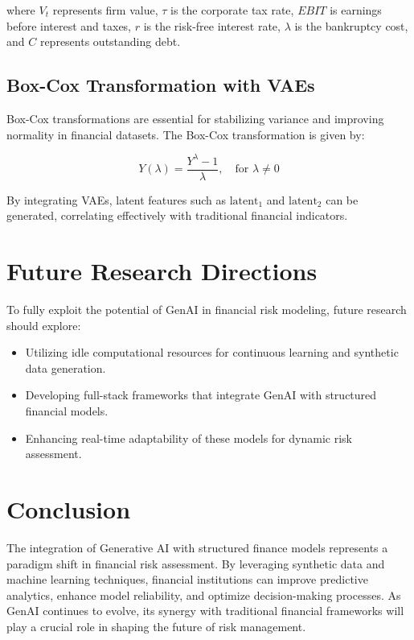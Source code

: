 \documentclass[a4paper,headinclude=on,footinclude=on,12pt,oneside]{scrbook}
\begin{document}
where $V_t$ represents firm value, $\tau$ is the corporate tax rate, $EBIT$ is earnings before interest and taxes, $r$ is the risk-free interest rate, $\lambda$ is the bankruptcy cost, and $C$ represents outstanding debt.

\subsection{Box-Cox Transformation with VAEs}
Box-Cox transformations are essential for stabilizing variance and improving normality in financial datasets. The Box-Cox transformation is given by:

\begin{equation}
	Y(\lambda) = \frac{Y^{\lambda} - 1}{\lambda}, \quad \text{for } \lambda \neq 0
\end{equation}

By integrating VAEs, latent features such as $\text{latent}_1$ and $\text{latent}_2$ can be generated, correlating effectively with traditional financial indicators.

\section{Future Research Directions}
To fully exploit the potential of GenAI in financial risk modeling, future research should explore:
\begin{itemize}
	\item Utilizing idle computational resources for continuous learning and synthetic data generation.
	\item Developing full-stack frameworks that integrate GenAI with structured financial models.
	\item Enhancing real-time adaptability of these models for dynamic risk assessment.
\end{itemize}

\section{Conclusion}
The integration of Generative AI with structured finance models represents a paradigm shift in financial risk assessment. By leveraging synthetic data and machine learning techniques, financial institutions can improve predictive analytics, enhance model reliability, and optimize decision-making processes. As GenAI continues to evolve, its synergy with traditional financial frameworks will play a crucial role in shaping the future of risk management.
\end{document}
